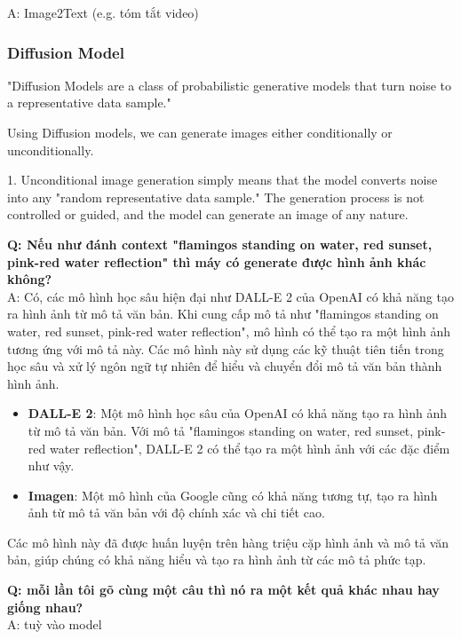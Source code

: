 A: Image2Text (e.g. tóm tắt video)



\subsubsection{Diffusion Model}


"Diffusion Models are a class of probabilistic generative models that turn noise to a representative data sample."

Using Diffusion models, we can generate images either conditionally or unconditionally.

1. Unconditional image generation simply means that the model converts noise into any "random representative data sample." The generation process is not controlled or guided, and the model can generate an image of any nature.


\textbf{Q: Nếu như đánh context "flamingos standing on water, red sunset, pink-red water reflection" thì máy có generate được hình ảnh khác không?}\\
A: Có, các mô hình học sâu hiện đại như DALL-E 2 của OpenAI có khả năng tạo ra hình ảnh từ mô tả văn bản. Khi cung cấp mô tả như "flamingos standing on water, red sunset, pink-red water reflection", mô hình có thể tạo ra một hình ảnh tương ứng với mô tả này. Các mô hình này sử dụng các kỹ thuật tiên tiến trong học sâu và xử lý ngôn ngữ tự nhiên để hiểu và chuyển đổi mô tả văn bản thành hình ảnh.

\begin{itemize}
    \item \textbf{DALL-E 2}: Một mô hình học sâu của OpenAI có khả năng tạo ra hình ảnh từ mô tả văn bản. Với mô tả "flamingos standing on water, red sunset, pink-red water reflection", DALL-E 2 có thể tạo ra một hình ảnh với các đặc điểm như vậy.
    \item \textbf{Imagen}: Một mô hình của Google cũng có khả năng tương tự, tạo ra hình ảnh từ mô tả văn bản với độ chính xác và chi tiết cao.
\end{itemize}

Các mô hình này đã được huấn luyện trên hàng triệu cặp hình ảnh và mô tả văn bản, giúp chúng có khả năng hiểu và tạo ra hình ảnh từ các mô tả phức tạp.


\textbf{Q: mỗi lần tôi gõ cùng một câu thì nó ra một kết quả khác nhau hay giống nhau?}\\
A: tuỳ vào model


